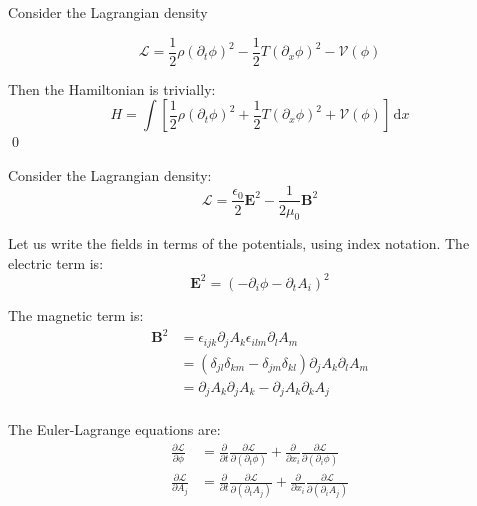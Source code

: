 \documentclass[12pt]{article}
\begin{document}
Consider the Lagrangian density

\begin{equation}
    \mathcal{L} = \frac{1}{2} \rho (\partial_{t} \phi)^{2} - \frac{1}{2} T (\partial_{x} \phi)^{2} - \mathcal{V}(\phi)
\end{equation}

Then the Hamiltonian is trivially:
\begin{equation}
    H = \int \left[ \frac{1}{2} \rho (\partial_{t} \phi)^{2} + \frac{1}{2} T (\partial_{x} \phi)^{2} + \mathcal{V}(\phi) \right] \, \mathrm{d}x
\end{equation}
\qed



Consider the Lagrangian density:
\begin{equation}
    \mathcal{L} = \frac{\epsilon_{0}}{2} \mathbf{E}^{2} - \frac{1}{2\mu_{0}} \mathbf{B}^{2}
\end{equation}

Let us write the fields in terms of the potentials, using index notation. The electric term is:
\begin{equation}
    \mathbf{E}^{2} = (-\partial_{i} \phi - \partial_{t} A_{i})^{2}
\end{equation}

The magnetic term is:
\begin{equation}
    \begin{split}
        \mathbf{B}^{2} &= \epsilon_{ijk} \partial_{j} A_{k} \epsilon_{ilm} \partial_{l} A_{m} \\
        &= (\delta_{jl} \delta_{km} - \delta_{jm} \delta_{kl}) \partial_{j} A_{k} \partial_{l} A_{m} \\
        &= \partial_{j} A_{k} \partial_{j} A_{k} - \partial_{j} A_{k} \partial_{k} A_{j} \\
    \end{split}
\end{equation}

The Euler-Lagrange equations are:
\begin{equation}
    \begin{split}
        \frac{\partial \mathcal{L}}{\partial \phi} &= \frac{\partial}{\partial t} \frac{\partial \mathcal{L}}{\partial (\partial_{t} \phi)} + \frac{\partial}{\partial x_{i}} \frac{\partial \mathcal{L}}{\partial (\partial_{i} \phi)} \\
        \frac{\partial \mathcal{L}}{\partial A_{j}} &= \frac{\partial}{\partial t} \frac{\partial \mathcal{L}}{\partial (\partial_{t} A_{j})} + \frac{\partial}{\partial x_{i}} \frac{\partial \mathcal{L}}{\partial (\partial_{i} A_{j})} \\
    \end{split}
\end{equation}
\end{document}
